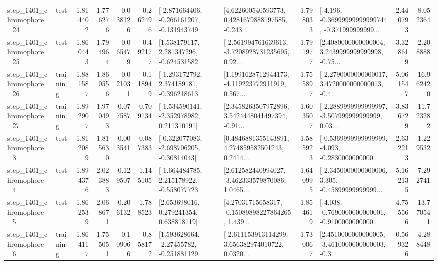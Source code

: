 \begin{tabular}{llrrrrllrlrr}
 step\_1401\_chromophore\_24 &      test &      1.814402 &    1.776276 &     -0.038126 & -0.262496 &  [-2.871664406, -0.266161207, -0.131943749] &  [4.622600540593773, 0.4281679888197585, -0.243... &       1.798033 &  [-4.196, -0.36999999999999744, -0.371999999999... &            2.440793 &          8.052364 \\
 step\_1401\_chromophore\_25 &      test &      1.860443 &    1.794964 &     -0.065479 & -0.492177 &    [1.538179117, 2.281347296, -0.624531582] &  [-2.561994761639613, -3.7208928731235695, 0.92... &       1.791977 &  [2.4080000000000004, 3.2439999999999998, -0.75... &            3.328619 &          2.208888 \\
 step\_1401\_chromophore\_26 &  training &      1.881587 &    1.860556 &     -0.021031 & -0.118949 &   [-1.293172792, 2.374189181, -0.396218613] &  [1.1991628712944173, -4.119223772911919, 0.567... &       1.755897 &  [-2.2790000000000017, 3.4720000000000013, -0.4... &            5.061547 &         16.962420 \\
 step\_1401\_chromophore\_27 &  training &      1.892907 &    1.970493 &      0.077587 &  0.709134 &   [-1.534590141, -2.352978982, 0.211310191] &  [2.3458263507972896, 3.5424448041497394, -0.91... &       1.603507 &  [-2.2889999999999997, -3.507999999999999, 0.03... &            3.836729 &         11.723282 \\
  step\_1401\_chromophore\_3 &      test &      1.812089 &    1.815630 &      0.003541 &  0.087383 &   [-0.322077083, -2.698706205, -0.30814043] &  [0.4846881355143891, 4.274859582501243, 0.2414... &       1.585923 &  [-0.5369999999999999, -4.093, -0.2830000000000... &            2.632213 &          1.229532 \\
  step\_1401\_chromophore\_4 &      test &      1.894376 &    2.023883 &      0.129507 &  1.145105 &   [-1.664484785, 2.215178922, -0.558077723] &  [2.612582440994027, -3.462333579870086, 1.0465... &       1.640995 &  [-2.3450000000000006, 3.305, -0.45899999999999... &            5.162135 &          7.292741 \\
  step\_1401\_chromophore\_5 &      test &      1.862539 &    2.068671 &      0.206132 &  1.788523 &     [2.653698016, 0.279241354, 0.638818119] &  [4.27031715658317, -0.15089898227864265, 1.439... &       1.854619 &  [-4.038, -0.7690000000000001, -0.9100000000000... &            4.755566 &         13.770541 \\
  step\_1401\_chromophore\_6 &  training &      1.864117 &    1.755051 &     -0.109066 & -0.858172 &    [1.593628664, -2.27455782, -0.251881129] &  [-2.611153913114299, 3.656382974010722, 0.0320... &       1.730067 &  [2.4510000000000005, -3.4610000000000003, -0.3... &            0.569326 &          4.288448 \\

\end{tabular}
